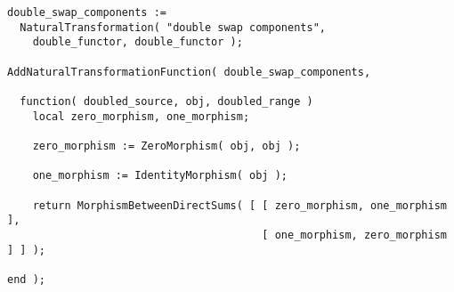 \begin{small}
\begin{Verbatim}[frame=single]
double_swap_components := 
  NaturalTransformation( "double swap components",
    double_functor, double_functor );

AddNaturalTransformationFunction( double_swap_components,
  
  function( doubled_source, obj, doubled_range )
    local zero_morphism, one_morphism;
    
    zero_morphism := ZeroMorphism( obj, obj );
    
    one_morphism := IdentityMorphism( obj );
    
    return MorphismBetweenDirectSums( [ [ zero_morphism, one_morphism ],
                                        [ one_morphism, zero_morphism ] ] );
    
end );
\end{Verbatim}
\end{small}